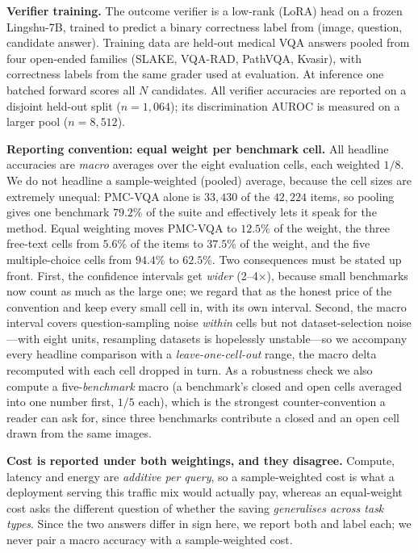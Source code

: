 \documentclass[conference]{IEEEtran}
\begin{document}
\textbf{Verifier training.} The outcome verifier is a low-rank (LoRA) head on a frozen Lingshu-7B, trained to predict a binary correctness label from (image, question, candidate answer). Training data are held-out medical VQA answers pooled from four open-ended families (SLAKE, VQA-RAD, PathVQA, Kvasir), with correctness labels from the same grader used at evaluation. At inference one batched forward scores all $N$ candidates. All verifier accuracies are reported on a disjoint held-out split ($n{=}1{,}064$); its discrimination AUROC is measured on a larger pool ($n{=}8{,}512$).

\textbf{Reporting convention: equal weight per benchmark cell.}\label{par:weighting} All headline accuracies are \emph{macro} averages over the eight evaluation cells, each weighted $1/8$. We do not headline a sample-weighted (pooled) average, because the cell sizes are extremely unequal: PMC-VQA alone is $33{,}430$ of the $42{,}224$ items, so pooling gives one benchmark $79.2\%$ of the suite and effectively lets it speak for the method. Equal weighting moves PMC-VQA to $12.5\%$ of the weight, the three free-text cells from $5.6\%$ of the items to $37.5\%$ of the weight, and the five multiple-choice cells from $94.4\%$ to $62.5\%$. Two consequences must be stated up front. First, the confidence intervals get \emph{wider} (2--4$\times$), because small benchmarks now count as much as the large one; we regard that as the honest price of the convention and keep every small cell in, with its own interval. Second, the macro interval covers question-sampling noise \emph{within} cells but not dataset-selection noise---with eight units, resampling datasets is hopelessly unstable---so we accompany every headline comparison with a \emph{leave-one-cell-out} range, the macro delta recomputed with each cell dropped in turn. As a robustness check we also compute a five-\emph{benchmark} macro (a benchmark's closed and open cells averaged into one number first, $1/5$ each), which is the strongest counter-convention a reader can ask for, since three benchmarks contribute a closed and an open cell drawn from the same images.

\textbf{Cost is reported under both weightings, and they disagree.} Compute, latency and energy are \emph{additive per query}, so a sample-weighted cost is what a deployment serving this traffic mix would actually pay, whereas an equal-weight cost asks the different question of whether the saving \emph{generalises across task types}. Since the two answers differ in sign here, we report both and label each; we never pair a macro accuracy with a sample-weighted cost.
\end{document}
